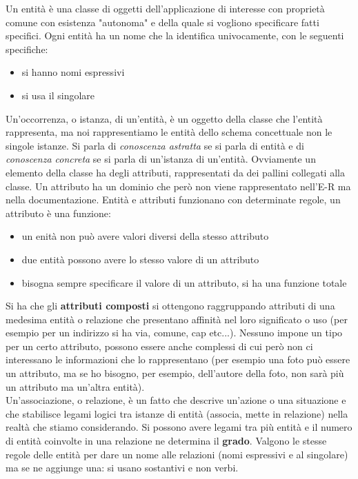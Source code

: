 \documentclass[a4paper,12pt, oneside]{book}
\begin{document}
Un entità è una classe di oggetti dell'applicazione di interesse con proprietà comune con esistenza "autonoma" e della quale si vogliono specificare fatti specifici. Ogni entità ha un nome che la identifica univocamente, con le seguenti specifiche:
\begin{itemize}
\item si hanno nomi espressivi
\item si usa il singolare
\end{itemize}
Un'occorrenza, o istanza, di un'entità, è un oggetto della classe che l'entità rappresenta, ma noi rappresentiamo le entità dello schema concettuale non le singole istanze. Si parla di \textit{ conoscenza astratta} se si parla di entità e di \textit{conoscenza concreta} se si parla di un'istanza di un'entità. Ovviamente un elemento della classe ha degli attributi, rappresentati da dei pallini collegati alla classe. Un attributo ha un dominio che però non viene rappresentato nell'E-R ma nella documentazione. Entità e attributi funzionano con determinate regole, un attributo è una funzione:
\begin{itemize}
\item un enità non può avere valori diversi della stesso attributo
\item due entità possono avere lo stesso valore di un attributo
\item bisogna sempre specificare il valore di un attributo, si ha una funzione totale
\end{itemize}
Si ha che gli \textbf{attributi composti} si ottengono raggruppando attributi di una
medesima entità o relazione che presentano
affinità nel loro significato o uso (per esempio per un indirizzo si ha via, comune, cap etc...). Nessuno impone un tipo per un certo attributo, possono essere anche complessi di cui però non ci interessano le informazioni che lo rappresentano (per esempio una foto può essere un attributo, ma se ho bisogno, per esempio, dell'autore della foto, non sarà più un attributo ma un'altra entità). \\
Un'associazione, o relazione, è un fatto che descrive un'azione o una situazione e che stabilisce legami logici tra
istanze di entità (associa, mette in relazione)
nella realtà che stiamo considerando. Si possono avere legami tra più entità e il numero di entità coinvolte in una relazione ne determina il \textbf{grado}. Valgono le stesse regole delle entità per dare un nome alle relazioni (nomi espressivi e al singolare) ma se ne aggiunge una: si usano sostantivi e non verbi. \\
\end{document}
